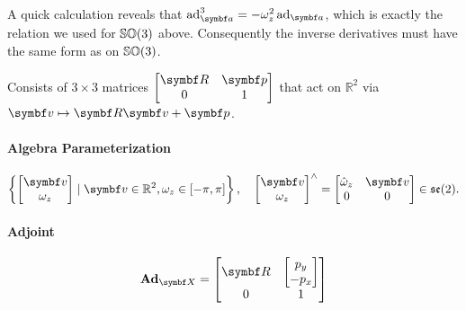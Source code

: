 A quick calculation reveals that $\ad_\a^3 = -\omega_z^2 \ad_\a$, which is exactly the relation we used for ${\mathbb{SO}(3)}$ above. Consequently the inverse derivatives must have the same form as on ${\mathbb{SO}(3)}$.


\begin{properties}[breakable, title={$\SEtwo$ formula sheet}]
  Consists of $3 \times 3$ matrices $ \begin{bmatrix} \bR & \bp \\ 0 & 1 \end{bmatrix}$ that act on $\mathbb{R}^{2}$ via $\bv \mapsto \bR \bv + \bp$.

  \paragraph{Algebra Parameterization}
  \begin{equation}
    \left\{\begin{bmatrix} \bv \\ \omega_{z} \end{bmatrix} \mid \bv \in \mathbb{R}^{2},  \omega_{z} \in [-\pi, \pi] \right\}, \quad \begin{bmatrix} \bv \\ \omega_{z} \end{bmatrix}^{\wedge} =
    \begin{bmatrix}
      \hat \omega_{z} & \bv \\ 0 & 0
    \end{bmatrix} \in \setwo.
  \end{equation}

  \paragraph{Adjoint}
  \begin{equation}
    \bAd_{\X} = \begin{bmatrix}
      \bR & \begin{bmatrix} p_{y} \\ -p_{x} \end{bmatrix}
       \\ 0 & 1
    \end{bmatrix}
  \end{equation}


\end{properties}
